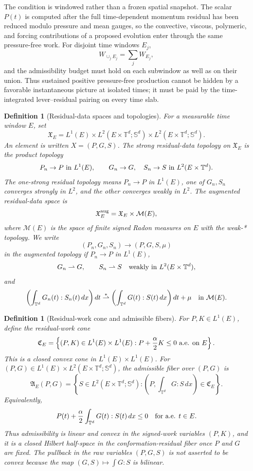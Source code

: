 \documentclass[11pt]{article}
\numberwithin{equation}{section}
\newtheorem{definition}[theorem]{Definition}
\newcommand{\T}{\mathbb T}
\newcommand{\Sym}{\mathbb S}
\begin{document}
The condition is windowed rather than a frozen spatial snapshot.  The scalar
\(P(t)\) is computed after the full time-dependent momentum residual has been
reduced modulo pressure and mean gauges, so the convective, viscous, polymeric,
and forcing contributions of a proposed evolution enter through the same
pressure-free work.  For disjoint time windows \(E_j\),
\[
  W_{\cup_j E_j}=\sum_j W_{E_j},
\]
and the admissibility budget must hold on each subwindow as well as on their
union.  Thus sustained positive pressure-free production cannot be hidden by a
favorable instantaneous picture at isolated times; it must be paid by the
time-integrated lever--residual pairing on every time slab.

\begin{definition}[Residual-data spaces and topologies]
\label{def:residual-data-space}
For a measurable time window \(E\), set
\[
  \mathfrak X_E
  =
  L^1(E)\times L^2(E\times\T^d;\Sym^d)
  \times L^2(E\times\T^d;\Sym^d).
\]
An element is written \(X=(P,G,S)\).  The strong residual-data topology on
\(\mathfrak X_E\) is the product topology
\[
  P_n\to P\hbox{ in }L^1(E),\qquad
  G_n\to G,\quad S_n\to S\hbox{ in }L^2(E\times\T^d).
\]
The one-strong residual topology means \(P_n\to P\) in \(L^1(E)\), one of
\(G_n,S_n\) converges strongly in \(L^2\), and the other converges weakly in
\(L^2\).  The augmented residual-data space is
\[
  \mathfrak X_E^{\rm aug}
  =
  \mathfrak X_E\times\mathcal M(E),
\]
where \(\mathcal M(E)\) is the space of finite signed Radon measures on \(E\)
with the weak-* topology.  We write
\[
  (P_n,G_n,S_n)\to(P,G,S,\mu)
\]
in the augmented topology if \(P_n\to P\) in \(L^1(E)\),
\[
  G_n\rightharpoonup G,\qquad S_n\rightharpoonup S
  \quad\hbox{weakly in }L^2(E\times\T^d),
\]
and
\[
  \left(\int_{\T^d}G_n(t):S_n(t)\,dx\right)dt
  \stackrel{*}{\rightharpoonup}
  \left(\int_{\T^d}G(t):S(t)\,dx\right)dt+\mu
  \quad\hbox{in }\mathcal M(E).
\]
\end{definition}

\begin{definition}[Residual-work cone and admissible fibers]
\label{def:residual-work-cone}
For \(P,K\in L^1(E)\), define the residual-work cone
\[
  \mathfrak C_E
  =
  \left\{(P,K)\in L^1(E)\times L^1(E):
  P+\frac{\alpha}{2}K\le0\hbox{ a.e. on }E\right\}.
\]
This is a closed convex cone in \(L^1(E)\times L^1(E)\).  For
\((P,G)\in L^1(E)\times L^2(E\times\T^d;\Sym^d)\), the admissible fiber over
\((P,G)\) is
\[
  \mathfrak A_E(P,G)
  =
  \left\{S\in L^2(E\times\T^d;\Sym^d):
  \left(P,\int_{\T^d}G:S\,dx\right)\in\mathfrak C_E\right\}.
\]
Equivalently,
\[
  P(t)+\frac{\alpha}{2}\int_{\T^d}G(t):S(t)\,dx\le0
  \quad\hbox{for a.e. }t\in E.
\]
Thus admissibility is linear and convex in the signed-work variables
\((P,K)\), and it is a closed Hilbert half-space in the conformation-residual
fiber once \(P\) and \(G\) are fixed.  The pullback in the raw variables
\((P,G,S)\) is not asserted to be convex because the map
\((G,S)\mapsto\int G:S\) is bilinear.
\end{definition}
\end{document}
